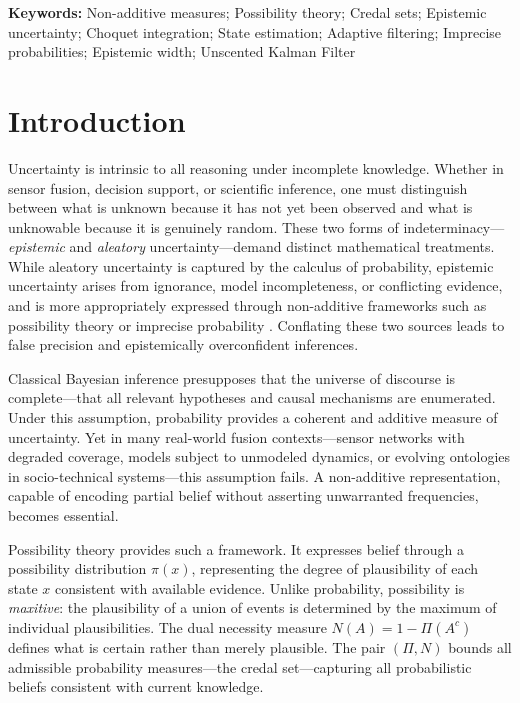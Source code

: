 \documentclass[12pt]{article}
\begin{document}
\newpage

\noindent\textbf{Keywords:} Non-additive measures; Possibility theory; Credal sets;
Epistemic uncertainty; Choquet integration; State estimation; Adaptive filtering;
Imprecise probabilities; Epistemic width; Unscented Kalman Filter

\section{Introduction}
\label{sec:intro}

Uncertainty is intrinsic to all reasoning under incomplete knowledge.
Whether in sensor fusion, decision support, or scientific inference, one must
distinguish between what is unknown because it has not yet been observed and
what is unknowable because it is genuinely random.
These two forms of indeterminacy---\emph{epistemic} and \emph{aleatory}
uncertainty---demand distinct mathematical treatments.
While aleatory uncertainty is captured by the calculus of probability,
epistemic uncertainty arises from ignorance, model incompleteness,
or conflicting evidence, and is more appropriately expressed through
non-additive frameworks such as possibility theory or imprecise probability
\cite{zadeh1978,dubois1988,walley1991}.
Conflating these two sources leads to false precision and epistemically
overconfident inferences.

Classical Bayesian inference presupposes that the universe of discourse is
complete---that all relevant hypotheses and causal mechanisms are enumerated.
Under this assumption, probability provides a coherent and additive measure
of uncertainty.
Yet in many real-world fusion contexts---sensor networks with degraded coverage,
models subject to unmodeled dynamics, or evolving ontologies in socio-technical
systems---this assumption fails.
A non-additive representation, capable of encoding partial belief without
asserting unwarranted frequencies, becomes essential.

Possibility theory \cite{zadeh1978,dubois1988} provides such a framework.
It expresses belief through a possibility distribution $\pi(x)$, representing
the degree of plausibility of each state $x$ consistent with available evidence.
Unlike probability, possibility is \emph{maxitive}: the plausibility of a union
of events is determined by the maximum of individual plausibilities.
The dual necessity measure $N(A)=1-\Pi(A^c)$ defines what is certain rather
than merely plausible.
The pair $(\Pi,N)$ bounds all admissible probability measures---the credal set---capturing
all probabilistic beliefs consistent with current knowledge.
\end{document}
